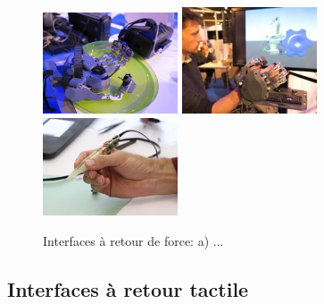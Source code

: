 \begin{figure}[!h]
	\centering
	\includegraphics[width=4cm]{Photos/cea_gant_1.jpg}\hspace{1cm}
	\includegraphics[width=4cm]{Photos/cea_gant_2.jpg}\hspace{1cm}
	\includegraphics[width=4cm]{Photos/pince_isir.jpg}
	\caption{Interfaces à retour de force: a) ... }\label{int_retourf_3}
\end{figure}

\subsection{Interfaces à retour tactile}

